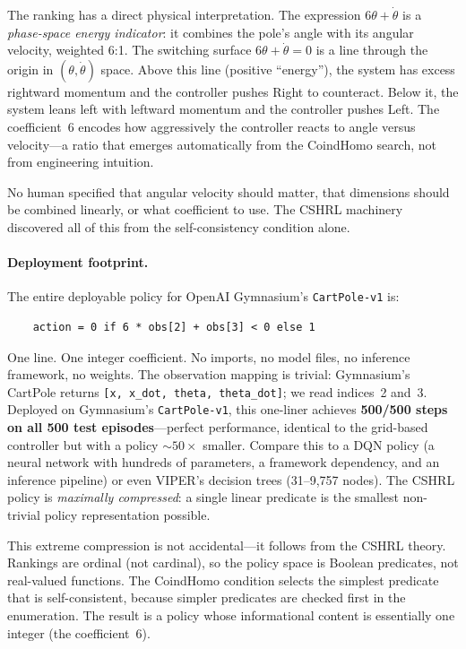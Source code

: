 \documentclass[9pt,a4paper]{article}
\theoremstyle{plain}
\theoremstyle{definition}
\theoremstyle{remark}
\begin{document}
The ranking has a direct physical interpretation.  The expression $6\theta + \dot\theta$ is a \emph{phase-space energy indicator}: it combines the pole's angle with its angular velocity, weighted 6:1.  The switching surface $6\theta + \dot\theta = 0$ is a line through the origin in $(\theta, \dot\theta)$ space.  Above this line (positive ``energy''), the system has excess rightward momentum and the controller pushes Right to counteract.  Below it, the system leans left with leftward momentum and the controller pushes Left.  The coefficient~6 encodes how aggressively the controller reacts to angle versus velocity---a ratio that emerges automatically from the CoindHomo search, not from engineering intuition.

No human specified that angular velocity should matter, that dimensions should be combined linearly, or what coefficient to use.  The CSHRL machinery discovered all of this from the self-consistency condition alone.

\paragraph{Deployment footprint.}
The entire deployable policy for OpenAI Gymnasium's \texttt{CartPole-v1} is:

\begin{verbatim}
    action = 0 if 6 * obs[2] + obs[3] < 0 else 1
\end{verbatim}

\noindent One line.  One integer coefficient.  No imports, no model files, no inference framework, no weights.  The observation mapping is trivial: Gymnasium's CartPole returns \texttt{[x, x\_dot, theta, theta\_dot]}; we read indices~2 and~3.  Deployed on Gymnasium's \texttt{CartPole-v1}, this one-liner achieves \textbf{500/500 steps on all 500 test episodes}---perfect performance, identical to the grid-based controller but with a policy ${\sim}50\times$ smaller.  Compare this to a DQN policy (a neural network with hundreds of parameters, a framework dependency, and an inference pipeline) or even VIPER's decision trees (31--9{,}757 nodes).  The CSHRL policy is \emph{maximally compressed}: a single linear predicate is the smallest non-trivial policy representation possible.

This extreme compression is not accidental---it follows from the CSHRL theory.  Rankings are ordinal (not cardinal), so the policy space is Boolean predicates, not real-valued functions.  The CoindHomo condition selects the simplest predicate that is self-consistent, because simpler predicates are checked first in the enumeration.  The result is a policy whose informational content is essentially one integer (the coefficient~6).
\end{document}
